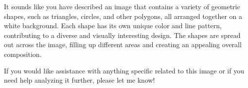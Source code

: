 It sounds like you have described an image that contains a variety of geometric shapes, such as triangles, circles, and other polygons, all arranged together on a white background. Each shape has its own unique color and line pattern, contributing to a diverse and visually interesting design. The shapes are spread out across the image, filling up different areas and creating an appealing overall composition.

If you would like assistance with anything specific related to this image or if you need help analyzing it further, please let me know!